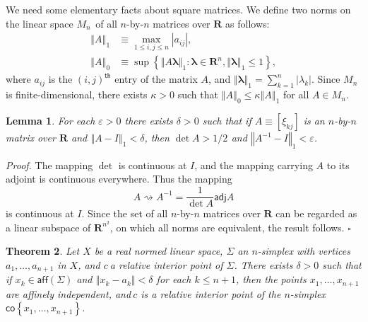 \documentclass[11pt]{article}%
\newtheorem{theorem}{Theorem}
\newtheorem{lemma}[theorem]{Lemma}
\newenvironment{proof}[1][Proof]{\noindent\textit{#1.} }{}
\begin{document}
%

\medskip
We need some elementary facts about square matrices. We define two norms on
the linear space $M_{n\text{ }}$of all $n$-by-$n$ matrices over $\mathbf{R}$
as follows:%
\begin{align*}
\left\Vert A\right\Vert _{1} &  \equiv\max_{1\leq i,j\leq n}\left\vert
a_{ij}\right\vert ,\\
\left\Vert A\right\Vert _{0} &  \equiv\sup\left\{  \left\Vert A\mathbf{\lambda
}\right\Vert _{1}:\mathbf{\lambda\in R}^{n},\left\Vert \mathbf{\lambda
}\right\Vert _{1}\leq1\right\}  ,
\end{align*}
where $a_{ij}$ is the $\left(  i,j\right)  ^{\mathsf{th}}$ entry of the matrix
$A$, and $\left\Vert \mathbf{\lambda}\right\Vert _{1}=\sum_{k=1}^{n}\left\vert
\lambda_{k}\right\vert $. Since $M_{n}$ is finite-dimensional, there exists
$\kappa>0$ such that $\left\Vert A\right\Vert _{0}\leq\kappa\left\Vert
A\right\Vert _{1}$ for all $A\in M_{n}$.

\begin{lemma}
\label{sept12l1}For each $\varepsilon>0$ there exists $\delta>0$ such that if
$A\equiv\left[  \xi_{kj}\right]  $ is an $n$-by-$n$ matrix over $\mathbf{R}$
and $\left\Vert A-I\right\Vert _{1}<\delta$, then $\det A>1/2\,\ $and
$\left\Vert A^{-1}-I\right\Vert _{1}<\varepsilon$.
\end{lemma}

\begin{proof}
The mapping $\det$ is continuous at $I$, and the mapping carrying $A$ to its
adjoint is continuous everywhere. Thus the mapping%
\[
A\rightsquigarrow A^{-1}=\frac{1}{\det A}\mathsf{adj}A
\]
is continuous at $I$. Since the set of all $n$-by-$n$ matrices over
$\mathbf{R}$ can be regarded as a linear subspace of $\mathbf{R}^{n^{2}}$, on
which all norms are equivalent, the result follows.%
\hfill
$\square$
\end{proof}

\begin{theorem}
\label{sept13t1}Let $X$ be a real normed linear space, $\Sigma$ an $n$-simplex
with vertices $a_{1},\ldots,a_{n+1}$ in $X$, and $c\ $a relative interior
point of $\Sigma$. There exists $\delta>0$ such that if $x_{k}\in
\mathsf{aff}(\Sigma)$ and $\left\Vert x_{k}-a_{k}\right\Vert <\delta$ for each
$k\leq n+1$, then the points $x_{1},\ldots,x_{n+1}$ are affinely independent,
and$\ c$ is a relative interior point of the $n$-simplex $\mathsf{co}\left\{
x_{1},\ldots,x_{n+1}\right\}  $.
\end{theorem}
\end{document}
